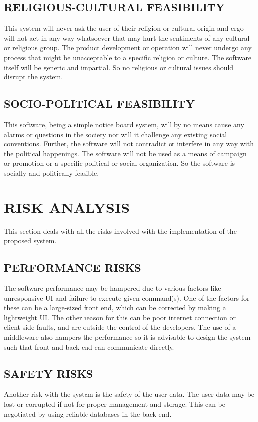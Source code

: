 \documentclass[12pt,a4paper]{article}
\begin{document}
    \subsection{RELIGIOUS-CULTURAL FEASIBILITY}
    This system will never ask the user of their religion or cultural origin and ergo will not act in any way whatsoever that may hurt the sentiments of any cultural or religious group. The product development or operation will never undergo any process that might be unacceptable to a specific religion or culture. The software itself will be generic and impartial. So no religious or cultural issues should disrupt the system.
    
    \subsection{SOCIO-POLITICAL FEASIBILITY}
    This software, being a simple notice board system, will by no means cause any alarms or questions in the society nor will it challenge any existing social conventions. Further, the software will not contradict or interfere in any way with the political happenings. The software will not be used as a means of campaign or promotion or a specific political or social organization. So the software is socially and politically feasible.

\newpage
\section{RISK ANALYSIS}
This section deals with all the risks involved with the implementation of the proposed system.

    \subsection{PERFORMANCE RISKS}
    The software performance may be hampered due to various factors like unresponsive UI and failure to execute given command(s). One of the factors for these can be a large-sized front end, which can be corrected by making a lightweight UI. The other reason for this can be poor internet connection or client-side faults, and are outside the control of the developers. The use of a middleware also hampers the performance so it is advisable to design the system such that front and back end can communicate directly.
    
    \subsection{SAFETY RISKS}
    Another risk with the system is the safety of the user data. The user data may be lost or corrupted if not for proper management and storage. This can be negotiated by using reliable databases in the back end.
    
\end{document}
